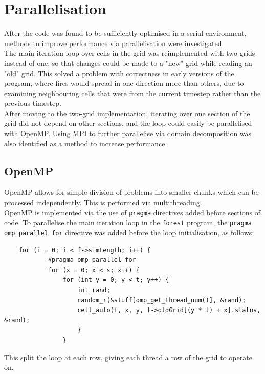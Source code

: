 \documentclass[11pt,a4paper]{report}
\begin{document}
\section{Parallelisation}

After the code was found to be sufficiently optimised in a serial environment,
methods to improve performance via parallelisation were investigated.\\

The main iteration loop over cells in the grid was reimplemented with two grids
instead of one, so that changes could be made to a "new" grid while reading an
"old" grid. This solved a problem with correctness in early versions of the
program, where fires would spread in one direction more than others, due to
examining neighbouring cells that were from the current timestep rather than
the previous timestep.\\

After moving to the two-grid implementation, iterating over one section of the
grid did not depend on other sections, and the loop could easily be
parallelised with OpenMP. Using MPI to further parallelise via domain
decomposition was also identified as a method to increase performance.

\subsection{OpenMP}

OpenMP allows for simple division of problems into smaller chunks which can be
processed independently. This is performed via multithreading.\\

OpenMP is implemented via the use of \texttt{pragma} directives added before
sections of code. To parallelise the main iteration loop in the \texttt{forest}
program, the \texttt{pragma omp parallel for} directive was added before the
loop initialisation, as follows:

\begin{verbatim}
    for (i = 0; i < f->simLength; i++) {
            #pragma omp parallel for
            for (x = 0; x < s; x++) {
                for (int y = 0; y < t; y++) {
                    int rand;
                    random_r(&stuff[omp_get_thread_num()], &rand);
                    cell_auto(f, x, y, f->oldGrid[(y * t) + x].status, &rand);
                    }
                }
\end{verbatim}

This split the loop at each row, giving each thread a row of the grid to
operate on.\\
\end{document}
